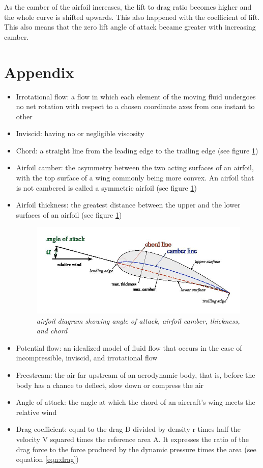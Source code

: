\documentclass{journal}
\begin{document}
	As the camber of the airfoil increases, the lift to drag ratio becomes higher and the whole curve is shifted upwards. This also happened with the coefficient of lift. This also means that the zero lift angle of attack became greater with increasing camber. 
	
	
	\section*{Appendix}
	
	\begin{itemize}
		\item Irrotational flow: a flow in which each element of the moving fluid undergoes no net rotation with respect to a chosen coordinate axes from one instant to other
		\item Inviscid: having no or negligible viscosity
		\item Chord: a straight line from the leading edge to the trailing edge (see figure \ref{fig:airfoil-diagram})
		\item Airfoil camber: the asymmetry between the two acting surfaces of an airfoil, with the top surface of a wing commonly being more convex. An airfoil that is not cambered is called a symmetric airfoil (see figure \ref{fig:airfoil-diagram})
		\item Airfoil thickness: the greatest distance between the upper and the lower surfaces of an airfoil (see figure \ref{fig:airfoil-diagram})
		
		\begin{figure}
			\centering
			\includegraphics[scale=0.4]{../graphics/airfoil-diagram.jpg}
			\caption{\emph{airfoil diagram showing angle of attack, airfoil camber, thickness, and chord}}
			\label{fig:airfoil-diagram}
		\end{figure}
		
		\item Potential flow: an idealized model of fluid flow that occurs in the case of incompressible, inviscid, and irrotational flow
		\item Freestream: the air far upstream of an aerodynamic body, that is, before the body has a chance to deflect, slow down or compress the air
		\item Angle of attack: the angle at which the chord of an aircraft's wing meets the relative wind
		\item Drag coefficient: equal to the drag D divided by density r times half the velocity V squared times the reference area A. It expresses the ratio of the drag force to the force produced by the dynamic pressure times the area (see equation \ref{eqn:drag})
		

\end{itemize}
\end{document}
